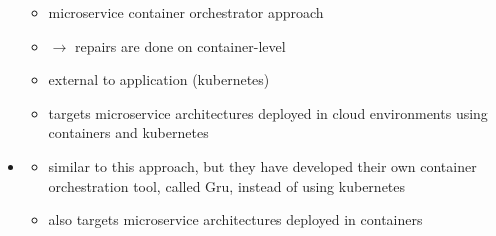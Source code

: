 \begin{itemize}
      \begin{itemize}
        \item microservice container orchestrator approach
        \item $\rightarrow$ repairs are done on container-level
        \item external to application (\gls{kubernetes})
        \item targets microservice architectures deployed in cloud environments using containers and \gls{kubernetes}
      \end{itemize}
    \item \cite{gru}
      \begin{itemize}
        \item similar to this approach, but they have developed their own container orchestration tool, called Gru, instead of using \gls{kubernetes}
        \item also targets microservice architectures deployed in containers
      \end{itemize}
  \end{itemize}
